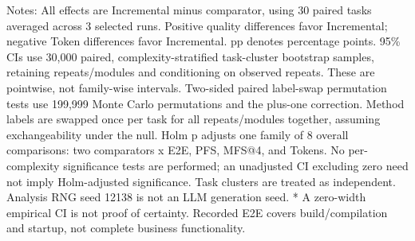 \par\smallskip
\begin{minipage}{\linewidth}
\footnotesize Notes: All effects are Incremental minus comparator, using 30 paired tasks averaged across 3 selected runs. Positive quality differences favor Incremental; negative Token differences favor Incremental. pp denotes percentage points. 95\% CIs use 30,000 paired, complexity-stratified task-cluster bootstrap samples, retaining repeats/modules and conditioning on observed repeats. These are pointwise, not family-wise intervals. Two-sided paired label-swap permutation tests use 199,999 Monte Carlo permutations and the plus-one correction. Method labels are swapped once per task for all repeats/modules together, assuming exchangeability under the null. Holm p adjusts one family of 8 overall comparisons: two comparators x E2E, PFS, MFS@4, and Tokens. No per-complexity significance tests are performed; an unadjusted CI excluding zero need not imply Holm-adjusted significance. Task clusters are treated as independent. Analysis RNG seed 12138 is not an LLM generation seed. * A zero-width empirical CI is not proof of certainty. Recorded E2E covers build/compilation and startup, not complete business functionality.
\end{minipage}
